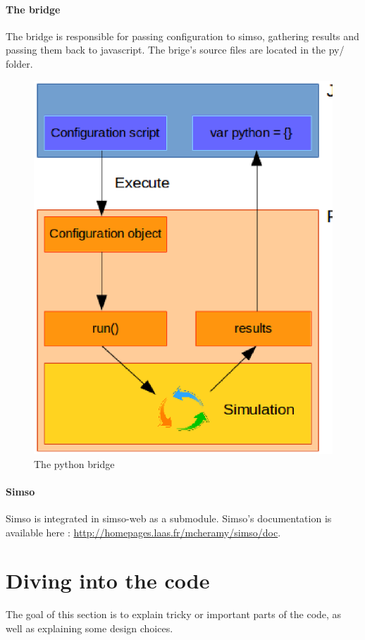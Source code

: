 \documentclass[10pt,a4paper]{article}
\begin{document}
\paragraph{The bridge}
The bridge is responsible for passing configuration to simso, gathering results and passing them back to javascript. The brige's source files are located in the py/ folder.
\begin{figure}[h]
\centering
\includegraphics[scale=0.50]{figure2.eps}
\caption{The python bridge}
\end{figure}


\paragraph{Simso}
Simso is integrated in simso-web as a submodule. Simso's documentation is available here : \href{"http://homepages.laas.fr/mcheramy/simso/doc"}{http://homepages.laas.fr/mcheramy/simso/doc}.

\section{Diving into the code}
The goal of this section is to explain tricky or important parts of the code, as well as explaining some design choices.
\end{document}
